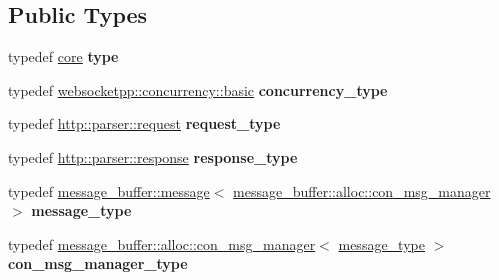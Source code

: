 \subsection*{Public Types}
\begin{DoxyCompactItemize}
\item 
\mbox{\label{structwebsocketpp_1_1config_1_1core_a889847e774c23625d729b6668d4d0ec8}} 
typedef \mbox{\hyperlink{structwebsocketpp_1_1config_1_1core}{core}} {\bfseries type}
\item 
\mbox{\label{structwebsocketpp_1_1config_1_1core_a894e9dea6f10e890ea21a687607c2f70}} 
typedef \mbox{\hyperlink{classwebsocketpp_1_1concurrency_1_1basic}{websocketpp\+::concurrency\+::basic}} {\bfseries concurrency\+\_\+type}
\item 
\mbox{\label{structwebsocketpp_1_1config_1_1core_a6b17eee7cb81f247afc8f3d7b3a3fc9e}} 
typedef \mbox{\hyperlink{classwebsocketpp_1_1http_1_1parser_1_1request}{http\+::parser\+::request}} {\bfseries request\+\_\+type}
\item 
\mbox{\label{structwebsocketpp_1_1config_1_1core_a08e9a1d498f9002cbabcb1102df6005b}} 
typedef \mbox{\hyperlink{classwebsocketpp_1_1http_1_1parser_1_1response}{http\+::parser\+::response}} {\bfseries response\+\_\+type}
\item 
\mbox{\label{structwebsocketpp_1_1config_1_1core_afb4c134e0a311beebe31a50458855279}} 
typedef \mbox{\hyperlink{classwebsocketpp_1_1message__buffer_1_1message}{message\+\_\+buffer\+::message}}$<$ \mbox{\hyperlink{classwebsocketpp_1_1message__buffer_1_1alloc_1_1con__msg__manager}{message\+\_\+buffer\+::alloc\+::con\+\_\+msg\+\_\+manager}} $>$ {\bfseries message\+\_\+type}
\item 
\mbox{\label{structwebsocketpp_1_1config_1_1core_a9f19abdae7b74d1595b410ea47f3e0d8}} 
typedef \mbox{\hyperlink{classwebsocketpp_1_1message__buffer_1_1alloc_1_1con__msg__manager}{message\+\_\+buffer\+::alloc\+::con\+\_\+msg\+\_\+manager}}$<$ \mbox{\hyperlink{classwebsocketpp_1_1message__buffer_1_1message}{message\+\_\+type}} $>$ {\bfseries con\+\_\+msg\+\_\+manager\+\_\+type}

\end{DoxyCompactItemize}
